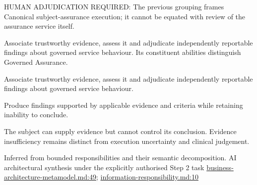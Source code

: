 HUMAN ADJUDICATION REQUIRED: The previous grouping frames Canonical subject-assurance execution; it cannot be equated with review of the assurance service itself.



Associate trustworthy evidence, assess it and adjudicate independently reportable findings about governed service behaviour. Its constituent abilities distinguish Governed Assurance.



Associate trustworthy evidence, assess it and adjudicate independently reportable findings about governed service behaviour.



Produce findings supported by applicable evidence and criteria while retaining inability to conclude.



The subject can supply evidence but cannot control its conclusion. Evidence insufficiency remains distinct from execution uncertainty and clinical judgement.


Inferred from bounded responsibilities and their semantic decomposition. AI architectural synthesis under the explicitly authorised Step 2 task \hyperref[evidence:4bac85accd34ce0b]{business-architecture-metamodel.md:49}; \hyperref[evidence:be61392fefb4bb10]{information-responsibility.md:10}
